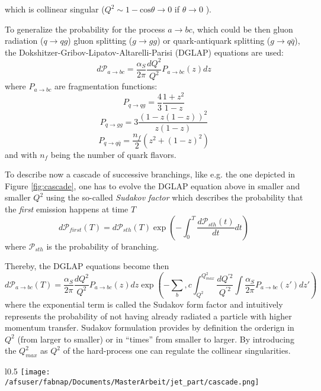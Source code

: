 which is collinear singular ($Q^2\sim 1-\textrm{cos}\theta\to 0$ if $\theta \to 0$ ).

To generalize the probability for the process $a\to bc$, which could be then gluon radiation ($q\to qg$) gluon splitting ($g\to gg$) or quark-antiquark splitting ($g\to q\bar{q}$), the Dokshitzer-Gribov-Lipatov-Altarelli-Parisi (DGLAP) equations are used:
$$d\mathcal{P}_{a\to bc}=\frac{\alpha_S}{2\pi} \frac{dQ^2}{Q^2}P_{a\to bc}(z)dz$$
where $P_{a\to bc}$ are fragmentation functions:
$$P_{q\to qg} = \frac{4}{3}\frac{1+z^2}{1-z} $$ 
$$P_{q\to gg} = 3 \frac{(1-z(1-z))^2}{z(1-z)} $$ 
$$P_{q\to q\bar{q}} = \frac{n_f}{2}(z^2+(1-z)^2) $$ 
and with $n_f$ being the number of quark flavors.

To describe now a cascade of successive branchings, like e.g. the one depicted in Figure \ref{fig:cascade}, one has to evolve the DGLAP equation above in smaller and smaller $Q^2$ using the so-called \textit{Sudakov factor} which describes  the probability that the \textit{first} emission happens at time $T$
$$d\mathcal{P}_{first}(T) = d\mathcal{P}_{sth}(T)\exp\left(-\int_0^T\frac{d\mathcal{P}_{sth}(t)}{dt}dt\right)$$
where $\mathcal{P}_{sth}$ is the probability of branching.

Thereby, the DGLAP equations become then
$$d\mathcal{P}_{a\to bc}(T) = \frac{\alpha_S}{2\pi} \frac{dQ^2}{Q^2}P_{a\to bc}(z) dz \exp\left(-\sum_b,c\int_{Q^2}^{Q^2_{max}}\frac{dQ^{'2}}{Q^{'2}}\int \frac{\alpha_S}{2\pi}P_{a\to bc}(z') dz'\right)$$
where the exponential term is called the Sudakov form factor and intuitively represents the probability of not having already radiated a particle with higher momentum transfer.
Sudakov formulation provides by definition the orderign in $Q^2$ (from larger to smaller) or in ``times'' from smaller to larger. By introducing the $Q^2_{max}$ as $Q^2$ of the hard-process one can regulate the collinear singularities.



\begin{wrapfigure}{l}{0.5\textwidth}
  \centering
      \texttt{[image: /afsuser/fabnap/Documents/MasterArbeit/jet\_part/cascade.png]}
  \caption{Example of cascade of successive branchings.}
  \label{fig:cascade}
\end{wrapfigure}

